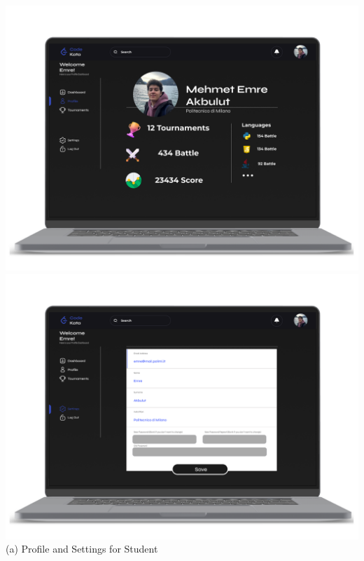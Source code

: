 \begin{center}
\includegraphics[scale=0.13]{Images/ui-ux/student_profile_settings/student_profile.png}
\includegraphics[scale=0.13]{Images/ui-ux/student_profile_settings/student_settings.png}
        (a) Profile and Settings for Student
\end{center}
\newpage
